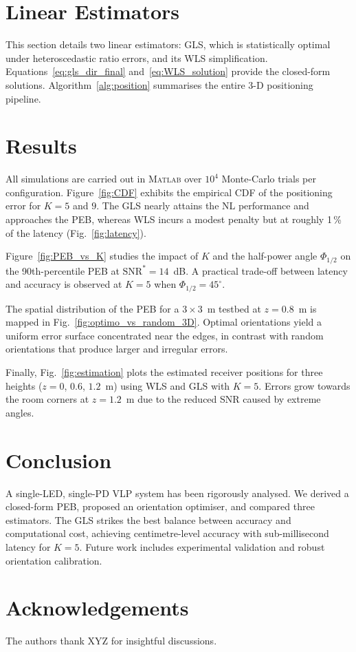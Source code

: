 \documentclass[lettersize,journal]{IEEEtran}
\begin{document}
\section{Linear Estimators}
\label{sec:Linear}
This section details two linear estimators: GLS, which is statistically optimal under heteroscedastic ratio errors, and its WLS simplification.  Equations~\eqref{eq:gls_dir_final} and~\eqref{eq:WLS_solution} provide the closed-form solutions.  Algorithm~\ref{alg:position} summarises the entire 3-D positioning pipeline.

\section{Results}
All simulations are carried out in \textsc{Matlab} over $10^{4}$ Monte-Carlo trials per configuration.  Figure~\ref{fig:CDF} exhibits the empirical CDF of the positioning error for $K\!=\!5$ and $9$.  The GLS nearly attains the NL performance and approaches the PEB, whereas WLS incurs a modest penalty but at roughly 1\,\% of the latency (Fig.~\ref{fig:latency}).

Figure~\ref{fig:PEB_vs_K} studies the impact of $K$ and the half-power angle $\Phi_{1/2}$ on the 90th-percentile PEB at $\mathrm{SNR}^{\!*}=14$~dB.  A practical trade-off between latency and accuracy is observed at $K=5$ when $\Phi_{1/2}=45^{\circ}$.

The spatial distribution of the PEB for a $3\!\times\!3$~m testbed at $z=0.8$~m is mapped in Fig.~\ref{fig:optimo_vs_random_3D}.  Optimal orientations yield a uniform error surface concentrated near the edges, in contrast with random orientations that produce larger and irregular errors.

Finally, Fig.~\ref{fig:estimation} plots the estimated receiver positions for three heights ($z\!=\!0$, $0.6$, $1.2$~m) using WLS and GLS with $K=5$.  Errors grow towards the room corners at $z=1.2$~m due to the reduced SNR caused by extreme angles.

\section{Conclusion}
A single-LED, single-PD VLP system has been rigorously analysed.  We derived a closed-form PEB, proposed an orientation optimiser, and compared three estimators.  The GLS strikes the best balance between accuracy and computational cost, achieving centimetre-level accuracy with sub-millisecond latency for $K\!=\!5$. Future work includes experimental validation and robust orientation calibration.

\section*{Acknowledgements}
The authors thank XYZ for insightful discussions.


%
\end{document}
